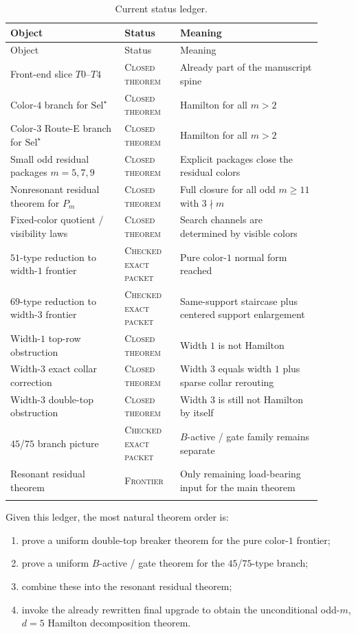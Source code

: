 \documentclass[11pt]{article}
\newcommand{\Pm}{P_m}
\newcommand{\SelStar}{\mathrm{Sel}^{\star}}
\newcommand{\status}[1]{\textsc{#1}}
\begin{document}
\begin{longtable}{p{0.33\linewidth}p{0.16\linewidth}p{0.41\linewidth}}
\toprule
Object & Status & Meaning \\
\midrule
\endfirsthead
\toprule
Object & Status & Meaning \\
\midrule
\endhead
Front-end slice $T0$--$T4$ & \status{Closed theorem} & Already part of the manuscript spine \\
Color-$4$ branch for $\SelStar$ & \status{Closed theorem} & Hamilton for all $m>2$ \\
Color-$3$ Route-E branch for $\SelStar$ & \status{Closed theorem} & Hamilton for all $m>2$ \\
Small odd residual packages $m=5,7,9$ & \status{Closed theorem} & Explicit packages close the residual colors \\
Nonresonant residual theorem for $\Pm$ & \status{Closed theorem} & Full closure for all odd $m\ge 11$ with $3\nmid m$ \\
Fixed-color quotient / visibility laws & \status{Closed theorem} & Search channels are determined by visible colors \\
$51$-type reduction to width-$1$ frontier & \status{Checked exact packet} & Pure color-$1$ normal form reached \\
$69$-type reduction to width-$3$ frontier & \status{Checked exact packet} & Same-support staircase plus centered support enlargement \\
Width-$1$ top-row obstruction & \status{Closed theorem} & Width $1$ is not Hamilton \\
Width-$3$ exact collar correction & \status{Closed theorem} & Width $3$ equals width $1$ plus sparse collar rerouting \\
Width-$3$ double-top obstruction & \status{Closed theorem} & Width $3$ is still not Hamilton by itself \\
$45$/$75$ branch picture & \status{Checked exact packet} & $B$-active / gate family remains separate \\
Resonant residual theorem & \status{Frontier} & Only remaining load-bearing input for the main theorem \\
\bottomrule
\caption{Current status ledger.}
\label{tab:status-ledger}
\end{longtable}

Given this ledger, the most natural theorem order is:
\begin{enumerate}[label=\textup{(\arabic*)},leftmargin=2.8em]
\item prove a uniform double-top breaker theorem for the pure color-$1$
      frontier;
\item prove a uniform $B$-active / gate theorem for the $45$/$75$-type branch;
\item combine these into the resonant residual theorem;
\item invoke the already rewritten final upgrade to obtain the unconditional
      odd-$m$, $d=5$ Hamilton decomposition theorem.
\end{enumerate}
\end{document}
